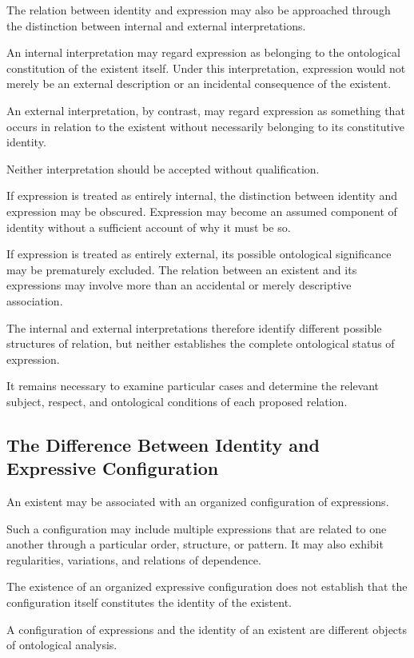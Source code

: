 The relation between identity and expression may
also be approached through the distinction between
internal and external interpretations.

An internal interpretation may regard expression
as belonging to the ontological constitution of
the existent itself. Under this interpretation,
expression would not merely be an external description
or an incidental consequence of the existent.

An external interpretation, by contrast, may regard
expression as something that occurs in relation
to the existent without necessarily belonging to
its constitutive identity.

Neither interpretation should be accepted without
qualification.

If expression is treated as entirely internal,
the distinction between identity and expression
may be obscured. Expression may become an assumed
component of identity without a sufficient account
of why it must be so.

If expression is treated as entirely external,
its possible ontological significance may be
prematurely excluded. The relation between an
existent and its expressions may involve more than
an accidental or merely descriptive association.

The internal and external interpretations therefore
identify different possible structures of relation,
but neither establishes the complete ontological
status of expression.

It remains necessary to examine particular cases
and determine the relevant subject, respect, and
ontological conditions of each proposed relation.

\subsection{The Difference Between Identity and Expressive Configuration}

An existent may be associated with an organized
configuration of expressions.

Such a configuration may include multiple expressions
that are related to one another through a particular
order, structure, or pattern. It may also exhibit
regularities, variations, and relations of dependence.

The existence of an organized expressive configuration
does not establish that the configuration itself
constitutes the identity of the existent.

A configuration of expressions and the identity
of an existent are different objects of ontological
analysis.

